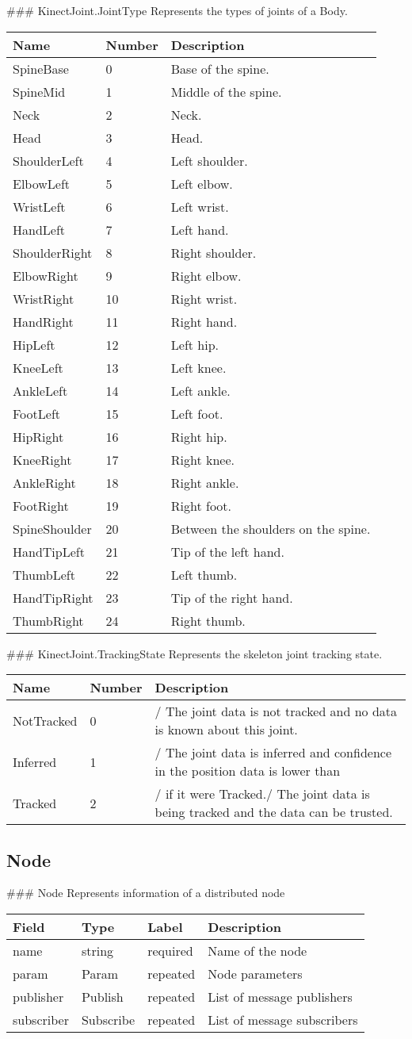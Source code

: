  \#\#\# KinectJoint.JointType Represents the types of joints of a Body.

\begin{longtable}[l]{@{}lll@{}}
\toprule
Name & Number & Description\tabularnewline
\midrule
\endhead
SpineBase & 0 & Base of the spine.\tabularnewline
SpineMid & 1 & Middle of the spine.\tabularnewline
Neck & 2 & Neck.\tabularnewline
Head & 3 & Head.\tabularnewline
ShoulderLeft & 4 & Left shoulder.\tabularnewline
ElbowLeft & 5 & Left elbow.\tabularnewline
WristLeft & 6 & Left wrist.\tabularnewline
HandLeft & 7 & Left hand.\tabularnewline
ShoulderRight & 8 & Right shoulder.\tabularnewline
ElbowRight & 9 & Right elbow.\tabularnewline
WristRight & 10 & Right wrist.\tabularnewline
HandRight & 11 & Right hand.\tabularnewline
HipLeft & 12 & Left hip.\tabularnewline
KneeLeft & 13 & Left knee.\tabularnewline
AnkleLeft & 14 & Left ankle.\tabularnewline
FootLeft & 15 & Left foot.\tabularnewline
HipRight & 16 & Right hip.\tabularnewline
KneeRight & 17 & Right knee.\tabularnewline
AnkleRight & 18 & Right ankle.\tabularnewline
FootRight & 19 & Right foot.\tabularnewline
SpineShoulder & 20 & Between the shoulders on the spine.\tabularnewline
HandTipLeft & 21 & Tip of the left hand.\tabularnewline
ThumbLeft & 22 & Left thumb.\tabularnewline
HandTipRight & 23 & Tip of the right hand.\tabularnewline
ThumbRight & 24 & Right thumb.\tabularnewline
\bottomrule
\end{longtable}

 \#\#\# KinectJoint.TrackingState Represents the skeleton joint tracking
state.

\begin{longtable}[l]{@{}lll@{}}
\toprule
Name & Number & Description\tabularnewline
\midrule
\endhead
NotTracked & 0 & / The joint data is not tracked and no data is known
about this joint.\tabularnewline
Inferred & 1 & / The joint data is inferred and confidence in the
position data is lower than\tabularnewline
Tracked & 2 & / if it were Tracked./ The joint data is being tracked and
the data can be trusted.\tabularnewline
\bottomrule
\end{longtable}

\subsection{Node}\label{node.proto}

 \#\#\# Node Represents information of a distributed node

\begin{longtable}[l]{@{}llll@{}}
\toprule
Field & Type & Label & Description\tabularnewline
\midrule
\endhead
name & string & required & Name of the node\tabularnewline
param & Param & repeated & Node parameters\tabularnewline
publisher & Publish & repeated & List of message
publishers\tabularnewline
subscriber & Subscribe & repeated & List of message
subscribers\tabularnewline
\bottomrule
\end{longtable}

